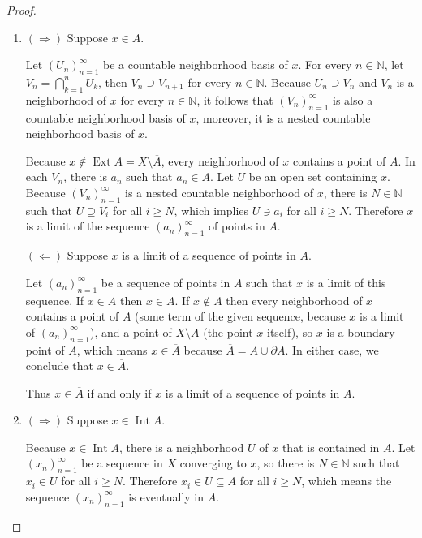 \begin{proof}
	\begin{enumerate}[label={(\alph*)}]
		\item $(\Rightarrow)$ Suppose $x\in \overline{A}$.

		      Let ${(U_{n})}^{\infty}_{n=1}$ be a countable neighborhood basis of $x$. For every $n\in\mathbb{N}$, let $V_{n} = \bigcap^{n}_{k=1}U_{k}$, then $V_{n}\supseteq V_{n+1}$ for every $n\in\mathbb{N}$. Because $U_{n}\supseteq V_{n}$ and $V_{n}$ is a neighborhood of $x$ for every $n\in\mathbb{N}$, it follows that ${(V_{n})}^{\infty}_{n=1}$ is also a countable neighborhood basis of $x$, moreover, it is a nested countable neighborhood basis of $x$.

		      Because $x\notin\operatorname{Ext}A = X\setminus\overline{A}$, every neighborhood of $x$ contains a point of $A$. In each $V_{n}$, there is $a_{n}$ such that $a_{n}\in A$. Let $U$ be an open set containing $x$. Because ${(V_{n})}^{\infty}_{n=1}$ is a nested countable neighborhood of $x$, there is $N\in\mathbb{N}$ such that $U\supseteq V_{i}$ for all $i\geq N$, which implies $U\ni a_{i}$ for all $i\geq N$. Therefore $x$ is a limit of the sequence ${(a_{n})}^{\infty}_{n=1}$ of points in $A$.

		      $(\Leftarrow)$ Suppose $x$ is a limit of a sequence of points in $A$.

		      Let ${(a_{n})}^{\infty}_{n=1}$ be a sequence of points in $A$ such that $x$ is a limit of this sequence. If $x\in A$ then $x\in\overline{A}$. If $x\notin A$ then every neighborhood of $x$ contains a point of $A$ (some term of the given sequence, because $x$ is a limit of ${(a_{n})}^{\infty}_{n=1}$), and a point of $X\setminus A$ (the point $x$ itself), so $x$ is a boundary point of $A$, which means $x\in\overline{A}$ because $\overline{A} = A\cup\partial A$. In either case, we conclude that $x\in \overline{A}$.

		      Thus $x\in\overline{A}$ if and only if $x$ is a limit of a sequence of points in $A$.
		\item $(\Rightarrow)$ Suppose $x\in\operatorname{Int} A$.

		      Because $x\in\operatorname{Int} A$, there is a neighborhood $U$ of $x$ that is contained in $A$. Let ${(x_{n})}^{\infty}_{n=1}$ be a sequence in $X$ converging to $x$, so there is $N\in\mathbb{N}$ such that $x_{i}\in U$ for all $i\geq N$. Therefore $x_{i}\in U\subseteq A$ for all $i\geq N$, which means the sequence ${(x_{n})}^{\infty}_{n=1}$ is eventually in $A$.


\end{enumerate}
\end{proof}
